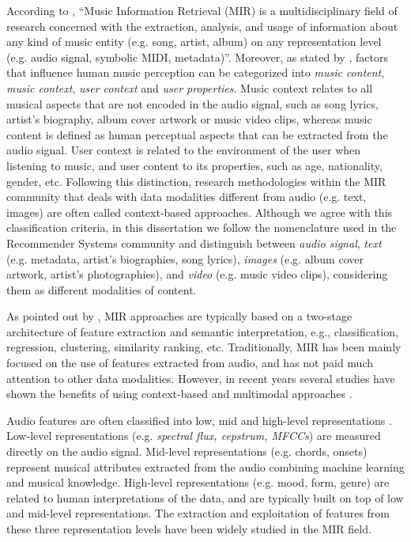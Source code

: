 According to \citep{schedl2008}, ``Music Information Retrieval (MIR) is a multidisciplinary field of research concerned with the extraction, analysis, and usage of information about any kind of music entity (e.g. song, artist, album) on any representation level (e.g. audio signal, symbolic MIDI, metadata)''. Moreover, as stated by \cite{Schedl2013}, factors that influence human music perception can be categorized into \textit{music content}, \textit{music context}, \textit{user context} and \textit{user properties}. Music context relates to all musical aspects that are not encoded in the audio signal, such as song lyrics, artist's biography, album cover artwork or music video clips, whereas music content is defined as human perceptual aspects that can be extracted from the audio signal. User context is related to the environment of the user when listening to music, and user content to its properties, such as age, nationality, gender, etc. Following this distinction, research methodologies within the MIR community that deals with data modalities different from audio (e.g. text, images) are often called context-based approaches. 
Although we agree with this classification criteria, in this dissertation we follow the nomenclature used in the Recommender Systems community \citep{Ostuni2013} and distinguish between \textit{audio signal}, \textit{text} (e.g. metadata, artist's biographies, song lyrics), \textit{images} (e.g. album cover artwork, artist's photographies), and \textit{video} (e.g. music video clips), considering them as different modalities of content.

As pointed out by \cite{humphrey2012}, MIR approaches are typically based on a two-stage architecture of feature extraction and semantic interpretation, e.g., classification, regression, clustering, similarity ranking, etc. 
Traditionally, MIR has been mainly focused on the use of features extracted from audio, and has not paid much attention to other data modalities. However, in recent years several studies have shown the benefits of using context-based and multimodal approaches \citep{Schedl2014}. 

Audio features are often classified into low, mid and high-level representations \citep{bello2015}. Low-level representations (e.g. \textit{spectral flux, cepstrum, MFCCs}) are measured directly on the audio signal. Mid-level representations (e.g. chords, onsets) represent musical attributes extracted from the audio combining machine learning and musical knowledge. High-level representations (e.g. mood, form, genre) are related to human interpretations of the data, and are typically built on top of low and mid-level representations. The extraction and exploitation of features from these three representation levels have been widely studied in the MIR field. 

